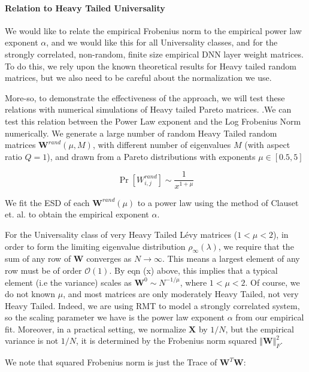 \paragraph{Relation to Heavy Tailed Universality}

We would like to relate the empirical Frobenius norm to the empirical power law exponent $\alpha$, and we would like this for all Universality classes,
and for the strongly correlated,  non-random, finite size empirical DNN layer weight matrices.  To do this, we rely upon the known theoretical
results for Heavy tailed random matrices, but we also need to be careful about the normalization we use.

More-so, to demonstrate the effectiveness of the approach, we will test these relations with numerical simulations of Heavy tailed Pareto matrices.
.We can test this relation between the Power Law exponent and the Log Frobenius Norm numerically.
We generate a large number of random Heavy Tailed random matrices $\mathbf{W}^{rand}(\mu,M)$, 
with different number of eigenvalues $M$ (with aspect ratio $Q=1$), 
and drawn from a Pareto distributions with exponents $\mu\in[0.5, 5]$

$$\Pr[{W}^{rand}_{i,j}]\sim\dfrac{1}{x^{1+\mu}}$$

We fit the ESD of each $\mathbf{W}^{rand}(\mu)$ to a power law using the method of Clauset et. al. to obtain the empirical exponent $\alpha$.  


For the Universality class of very Heavy Tailed L\'evy matrices ($1<\mu<2$), in order to form the limiting eigenvalue distribution $\rho_{\infty}(\lambda)$,
we require that the sum of any row of $\mathbf{W}$ converges as $N\rightarrow\infty$. This means a largest  element of any row
must be of order $\mathcal{O}(1)$.  By eqn (x) above, this implies that a typical element  (i.e the variance) scales as $\mathbf{W}^{0}\sim N^{-1/\mu}$, where $1<\mu<2$.
Of course, we do not known $\mu$, and most matrices are only moderately Heavy Tailed, not very Heavy Tailed.
Indeed, we are using RMT to model a strongly correlated system, so the scaling parameter
we have is the power law exponent $\alpha$ from our empirical fit.
Moreover, in a practical setting, we normalize $\mathbf{X}$ by $1/N$, but the empirical variance is not $1/N$, it is determined by the Frobenius norm squared
$\Vert\mathbf{W}\Vert^{2}_{F}$.   

We note that squared Frobenius norm is just the Trace of $\mathbf{W}^{T}\mathbf{W}$:

